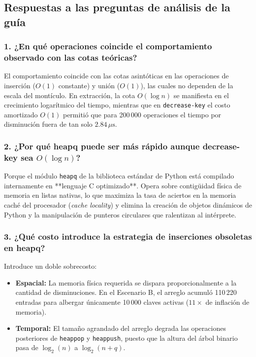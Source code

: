 \subsection{Respuestas a las preguntas de análisis de la guía}

\subsubsection*{1. ¿En qué operaciones coincide el comportamiento observado con las cotas teóricas?}
El comportamiento coincide con las cotas asintóticas en las operaciones de inserción ($O(1)$ constante) y unión ($O(1)$), las cuales no dependen de la escala del montículo. En extracción, la cota $O(\log n)$ se manifiesta en el crecimiento logarítmico del tiempo, mientras que en \texttt{decrease-key} el costo amortizado $O(1)$ permitió que para 200\,000 operaciones el tiempo por disminución fuera de tan solo $2.84\,\mu\text{s}$.

\subsubsection*{2. ¿Por qué heapq puede ser más rápido aunque decrease-key sea $O(\log n)$?}
Porque el módulo \texttt{heapq} de la biblioteca estándar de Python está compilado internamente en **lenguaje C optimizado**. Opera sobre contigüidad física de memoria en listas nativas, lo que maximiza la tasa de aciertos en la memoria caché del procesador (\textit{cache locality}) y elimina la creación de objetos dinámicos de Python y la manipulación de punteros circulares que ralentizan al intérprete.

\subsubsection*{3. ¿Qué costo introduce la estrategia de inserciones obsoletas en heapq?}
Introduce un doble sobrecosto:
\begin{itemize}
    \item \textbf{Espacial:} La memoria física requerida se dispara proporcionalmente a la cantidad de disminuciones. En el Escenario B, el arreglo acumuló 110\,220 entradas para albergar únicamente 10\,000 claves activas ($11\times$ de inflación de memoria).
    \item \textbf{Temporal:} El tamaño agrandado del arreglo degrada las operaciones posteriores de \texttt{heappop} y \texttt{heappush}, puesto que la altura del árbol binario pasa de $\log_2(n)$ a $\log_2(n + q)$.
\end{itemize}


